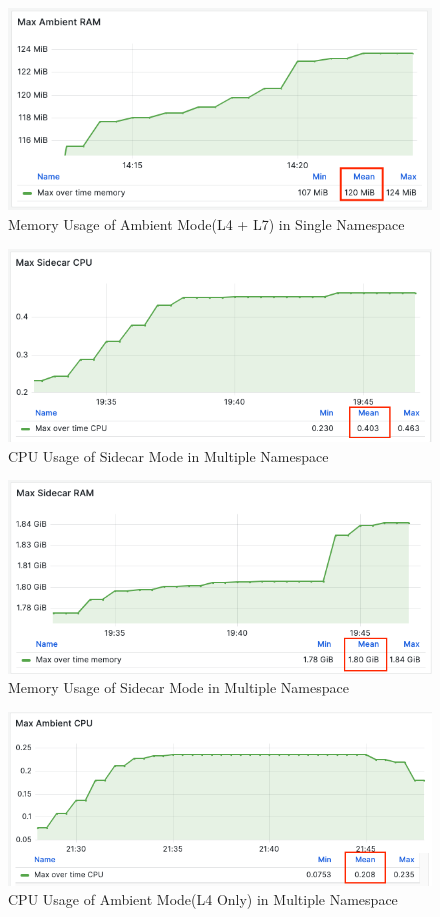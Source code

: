 \begin{figure}[H]
  \centering
  \includegraphics[width=0.8\linewidth]{resources/max-ambient-l4-l7-mem.png}
  \caption{Memory Usage of Ambient Mode(L4 + L7) in Single Namespace}
\end{figure}


\begin{figure}[H]
  \centering
  \includegraphics[width=0.8\linewidth]{resources/multi-ns-sidecar-cpu.png}
  \caption{CPU Usage of Sidecar Mode in Multiple Namespace}
\end{figure}

\begin{figure}[H]
  \centering
  \includegraphics[width=0.8\linewidth]{resources/multi-ns-sidecar-mem.png}
  \caption{Memory Usage of Sidecar Mode in Multiple Namespace}
\end{figure}

\begin{figure}[H]
  \centering
  \includegraphics[width=0.8\linewidth]{resources/ambient-multi-ns-l4-cpu.png}
  \caption{CPU Usage of Ambient Mode(L4 Only) in Multiple Namespace}
\end{figure}

